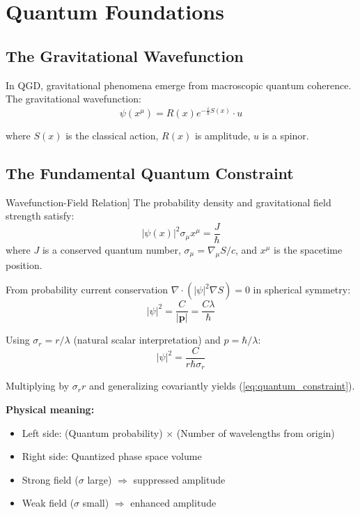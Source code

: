 \documentclass[11pt,a4paper]{article}
\theoremstyle{definition}
\theoremstyle{remark}
\begin{document}
		\section{Quantum Foundations}
		
		\subsection{The Gravitational Wavefunction}
		
		In QGD, gravitational phenomena emerge from macroscopic quantum coherence. The gravitational wavefunction:
		\begin{equation}\label{eq:wavefunction}
			\psi(x^\mu) = R(x)e^{-\frac{i}{\hbar}S(x)} \cdot u
		\end{equation}
		
		where $S(x)$ is the classical action, $R(x)$ is amplitude, $u$ is a spinor.
		
		\subsection{The Fundamental Quantum Constraint}
		
		Wavefunction-Field Relation]
			The probability density and gravitational field strength satisfy:
			\begin{equation}\label{eq:quantum_constraint}
				\boxed{|\psi(x)|^2 \sigma_\mu x^\mu = \frac{J}{\hbar}}
			\end{equation}
			where $J$ is a conserved quantum number, $\sigma_\mu = \nabla_\mu S/c$, and $x^\mu$ is the spacetime position.
		
			From probability current conservation $\nabla \cdot (|\psi|^2\nabla S) = 0$ in spherical symmetry:
			\begin{equation}
				|\psi|^2 = \frac{C}{|\mathbf{p}|} = \frac{C\lambda}{\hbar}
			\end{equation}
			
			Using $\sigma_r = r/\lambda$ (natural scalar interpretation) and $p = \hbar/\lambda$:
			\begin{equation}
				|\psi|^2 = \frac{C}{r\hbar\sigma_r}
			\end{equation}
			
			Multiplying by $\sigma_r r$ and generalizing covariantly yields (\ref{eq:quantum_constraint}).
		
		\textbf{Physical meaning:}
		\begin{itemize}
			\item Left side: (Quantum probability) $\times$ (Number of wavelengths from origin)
			\item Right side: Quantized phase space volume
			\item Strong field ($\sigma$ large) $\Rightarrow$ suppressed amplitude
			\item Weak field ($\sigma$ small) $\Rightarrow$ enhanced amplitude
		\end{itemize}
		
\end{document}
